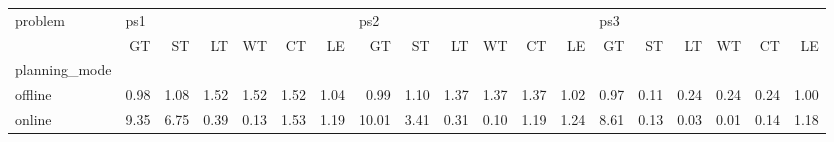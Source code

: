 \begin{tabular}{lrrrrrrrrrrrrrrrrrr}
\toprule
problem & \multicolumn{6}{l}{ps1} & \multicolumn{6}{l}{ps2} & \multicolumn{6}{l}{ps3} \\
{} &   GT &   ST &   LT &   WT &   CT &   LE &    GT &   ST &   LT &   WT &   CT &   LE &   GT &   ST &   LT &   WT &   CT &   LE \\
planning\_mode &      &      &      &      &      &      &       &      &      &      &      &      &      &      &      &      &      &      \\
\midrule
offline       & 0.98 & 1.08 & 1.52 & 1.52 & 1.52 & 1.04 &  0.99 & 1.10 & 1.37 & 1.37 & 1.37 & 1.02 & 0.97 & 0.11 & 0.24 & 0.24 & 0.24 & 1.00 \\
online        & 9.35 & 6.75 & 0.39 & 0.13 & 1.53 & 1.19 & 10.01 & 3.41 & 0.31 & 0.10 & 1.19 & 1.24 & 8.61 & 0.13 & 0.03 & 0.01 & 0.14 & 1.18 \\
\bottomrule
\end{tabular}
